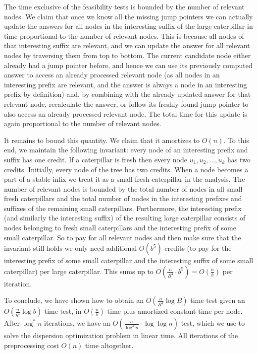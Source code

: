 \documentclass[a4paper,UKenglish]{lipics-v2016}
\theoremstyle{plain}
\begin{document}
The time exclusive of the feasibility tests is bounded by the number of relevant nodes.
We claim that once we know all the missing jump pointers we can actually update the answers
for all nodes in the interesting suffix of the large caterpillar in time proportional to the
number of relevant nodes. This is because all nodes of that interesting suffix are
relevant, and we can update the answer for all relevant nodes by traversing them from top
to bottom. The current candidate node either already had a jump pointer before, and hence
we can use its previously computed answer to access an already processed relevant node
(as all nodes in an interesting prefix are relevant, and the answer is always a node in an
interesting prefix by definition) and, by combining with the already updated answer for that
relevant node, recalculate the answer, or follow its freshly found jump pointer to also access
an already processed relevant node. The total time for this update is again proportional to the
number of relevant nodes. 

It remains to bound this quantity. We claim that it
amortizes to $O(n)$. To this end, we maintain the following invariant: every node
of an interesting prefix and suffix has one credit. If a caterpillar is fresh
then every node $u_{1},u_{2},\ldots,u_{k}$ has two credits. Initially, every node of the tree
has two credits. When a node becomes a part of a stable infix we treat it as a small fresh
caterpillar in the analysis. The number of relevant nodes is bounded by the total number
of nodes in all small fresh caterpillars and the total number of nodes in the interesting
prefixes and suffixes of the remaining small caterpillars. Furthermore,
the interesting prefix (and similarly the interesting suffix) of the resulting large caterpillar
consists of nodes belonging to fresh small caterpillars and the interesting prefix of
some small caterpillar. So to pay for all relevant nodes and then make sure that the invariant
still holds we only need additional $O(b^{5})$ credits (to pay for the interesting prefix
of some small caterpillar and the interesting suffix of some small caterpillar) per large
caterpillar. This sums up to $O(\frac{n}{B^{4}}\cdot b^{5}) = O(\frac{n}{b})$ per iteration.

To conclude, we have shown how to obtain an $O(\frac{n}{B^{4}}\log B)$ time test given an $O(\frac{n}{b^{4}}\log b)$
time test, in $O(\frac{n}{b})$ time plus amortized constant time per
node. After $\log ^*n$ iterations, we have an  $O(\frac{n}{\log ^4n} \cdot \log \log n)$ test,
which we use to solve the dispersion optimization problem in linear time. All iterations of the preprocessing
cost $O(n)$ time altogether.
\end{document}
